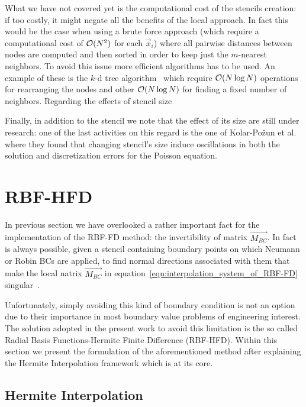 What we have not covered yet is the computational cost of the stencils creation: if too costly, it might negate all the benefits of the local approach. In fact this would be the case when using a brute force approach (which require a computational cost of $\mathcal{O}(N^2)$ for each $\vec{x}_i$) where all pairwise distances between nodes are computed and then sorted in order to keep just the $m$-nearest neighbors. To avoid this issue more efficient algorithms has to be used. An example of these is the $k$-d tree algorithm~\cite{Bentley:k-d_tree} which require $\mathcal{O}(N \log N)$ operations for rearranging the nodes and other $\mathcal{O}(N \log N)$ for finding a fixed number of neighbors. Regarding the effects of stencil size 

\bigskip
Finally, in addition to the stencil we note that the effect of its size are still under research: one of the last activities on this regard is the one of Kolar-Požun et al.~\cite{Kolar-Požun:effect_of_stencil_size} where they found that changing stencil's size induce oscillations in both the solution and discretization errors for the Poisson equation.




\section{RBF-HFD}

In previous section we have overlooked a rather important fact for the implementation of the RBF-FD method: the invertibility of matrix $\vec{M_{BC}}$. In fact is always possible, given a stencil containing boundary points on which Neumann or Robin BCs are applied, to find normal directions associated with them that make the local natrix $\vec{M_{BC}}$ in equation~\eqref{eqn:interpolation_system_of_RBF-FD} singular~\cite{Miotti:phd_thesis}.

Unfortunately, simply avoiding this kind of boundary condition is not an option due to their importance in most boundary value problems of engineering interest.
The solution adopted in the present work to avoid this limitation is the so called Radial Basis Functions-Hermite Finite Difference (RBF-HFD).
Within this section we present the formulation of the aforementioned method after explaining the Hermite Interpolation framework which is at its core.


\subsection{Hermite Interpolation}

